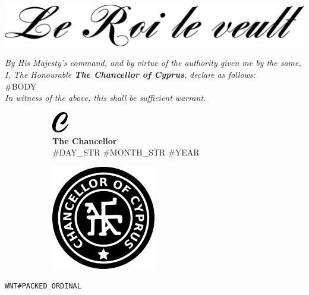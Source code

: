 \documentclass[varwidth=true,border=50pt]{standalone}
\begin{document}
\noindent \includegraphics[width=\textwidth]{le_roi_le_veult}

\vspace{10pt}

\textit{By His Majesty's command, and by virtue of the authority given me by the same, I, The Honourable \textbf{The Chancellor of Cyprus}, declare as follows:}\\

#BODY\\

\textit{In witness of the above, this shall be sufficient warrant.}

\vspace{20pt}

\begin{figure}
\centering
\begin{subfigure}{.5\textwidth}
    \centering
    \includegraphics[width=20pt]{c}\\
    \vspace{5pt}
    \textbf{The Chancellor}\\
    #DAY_STR #MONTH_STR #YEAR
\end{subfigure}%
\begin{subfigure}{.5\textwidth}
    \centering
    \includegraphics[width=0.5\textwidth]{stamp}
\end{subfigure}%
\end{figure}

\vspace{30pt}

\hfill {\footnotesize \texttt{WNT#PACKED_ORDINAL}}\\
{\tiny \texttt{}}
\end{document}
